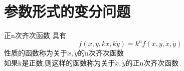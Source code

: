 \section{参数形式的变分问题}
正n次齐次函数
具有
$$
f(x,y,k\dot{x},k\dot{y})=k^nf(x,y,\dot{x},\dot{y})
$$
性质的函数称为关于$\dot{x},\dot{y}$的n次齐次函数\\
如果k是正数,则这样的函数称为关于$\dot{x},\dot{y}$的正n次齐次函数
